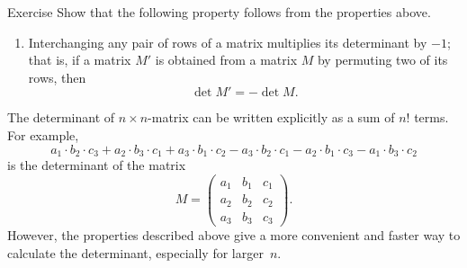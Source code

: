 \begin{thm}{Exercise}\label{ex:det}
Show that the following property follows from the properties above.
\end{thm}

\begin{enumerate}[resume]
 \item Interchanging any pair of rows of a matrix multiplies its determinant by $-1$; that is, if a matrix $M'$ is obtained from a matrix $M$ by permuting two of its rows, then 
\[\det M'=-\det M.\]
\end{enumerate}

The determinant of $n\times n$-matrix can be written explicitly as a sum of $n!$ terms. 
For example, 
\[
a_1{\cdot} b_2{\cdot} c_3+a_2{\cdot} b_3{\cdot} c_1+a_3{\cdot} b_1{\cdot} c_2-a_3{\cdot} b_2{\cdot} c_1-a_2{\cdot} b_1{\cdot} c_3-a_1{\cdot} b_3{\cdot} c_2\]
is the determinant of the matrix
\[M=\left(
\begin{matrix}
a_1&b_1&c_1
\\
a_2&b_2&c_2
\\
a_3&b_3&c_3
\end{matrix}
\right).\]
However, the properties described above give a more convenient and faster way to calculate the determinant, especially for larger~$n$.

